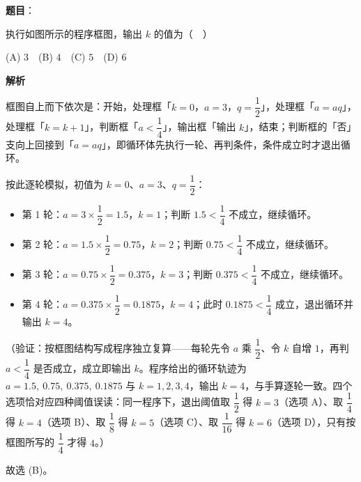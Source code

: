 \begin{answer}

\textbf{题目}：

执行如图所示的程序框图，输出 \(k\) 的值为（　）
\nopagebreak[4]
\begin{center}\end{center}
\nopagebreak[4]
(A) \(3\)　(B) \(4\)　(C) \(5\)　(D) \(6\)

\textbf{解析}

框图自上而下依次是：开始，处理框「\(k=0\)，\(a=3\)，\(q=\dfrac12\)」，处理框「\(a=aq\)」，处理框「\(k=k+1\)」，判断框「\(a<\dfrac14\)」，输出框「输出 \(k\)」，结束；判断框的「否」支向上回接到「\(a=aq\)」，即循环体先执行一轮、再判条件，条件成立时才退出循环。

按此逐轮模拟，初值为 \(k=0\)、\(a=3\)、\(q=\dfrac12\)：

\begin{itemize}
\item 第 1 轮：\(a=3\times\dfrac12=1.5\)，\(k=1\)；判断 \(1.5<\dfrac14\) 不成立，继续循环。
\item 第 2 轮：\(a=1.5\times\dfrac12=0.75\)，\(k=2\)；判断 \(0.75<\dfrac14\) 不成立，继续循环。
\item 第 3 轮：\(a=0.75\times\dfrac12=0.375\)，\(k=3\)；判断 \(0.375<\dfrac14\) 不成立，继续循环。
\item 第 4 轮：\(a=0.375\times\dfrac12=0.1875\)，\(k=4\)；此时 \(0.1875<\dfrac14\) 成立，退出循环并输出 \(k=4\)。
\end{itemize}

（验证：按框图结构写成程序独立复算——每轮先令 \(a\) 乘 \(\dfrac12\)、令 \(k\) 自增 \(1\)，再判 \(a<\dfrac14\) 是否成立，成立即输出 \(k\)。程序给出的循环轨迹为 \(a=1.5,\ 0.75,\ 0.375,\ 0.1875\) 与 \(k=1,2,3,4\)，输出 \(k=4\)，与手算逐轮一致。四个选项恰对应四种阈值误读：同一程序下，退出阈值取 \(\dfrac12\) 得 \(k=3\)（选项 A）、取 \(\dfrac14\) 得 \(k=4\)（选项 B）、取 \(\dfrac18\) 得 \(k=5\)（选项 C）、取 \(\dfrac{1}{16}\) 得 \(k=6\)（选项 D），只有按框图所写的 \(\dfrac14\) 才得 \(4\)。）

故选 (B)。


\end{answer}
